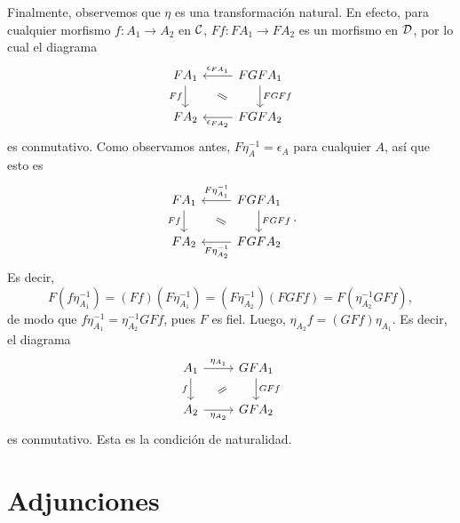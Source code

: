 \begin{sol}
    Finalmente, observemos que $\eta$ es una transformación natural.
    En efecto, para cualquier morfismo $f:A_1\to A_2$ en $\cal C$,
    $Ff:FA_1\to FA_2$ es un morfismo en $\cal D$, por lo cual el diagrama
    \[
        \begin{tikzcd}
            FA_1 \ar[d,"Ff"']
            & FGFA_1 \ar[l,"\epsilon_{FA_1}"'] \ar[d,"FGFf"] \\
            FA_2 & FGFA_2 \ar[l,"\epsilon_{FA_2}"]
            \com{1-1}{2-2}
        \end{tikzcd}
    \]
    es conmutativo.
    Como observamos antes, $F\eta_A^{-1}=\epsilon_A$ para cualquier $A$, así
    que esto es
    \[
        \begin{tikzcd}
            FA_1 \ar[d,"Ff"']
            & FGFA_1 \ar[l,"F\eta_{A_1}^{-1}"'] \ar[d,"FGFf"] \\
            FA_2 & FGFA_2 \ar[l,"F\eta_{A_2}^{-1}"]
            \com{1-1}{2-2}
        \end{tikzcd}
    .\]
    Es decir,
    \[
        F(f\eta_{A_1}^{-1})
        =(Ff)(F\eta_{A_1}^{-1})
        =(F\eta_{A_2}^{-1})(FGFf)
        =F(\eta_{A_2}^{-1}GFf)
    ,\]
    de modo que $f\eta_{A_1}^{-1}=\eta_{A_2}^{-1}GFf$, pues $F$ es fiel.
    Luego, $\eta_{A_2}f=(GFf)\eta_{A_1}$.
    Es decir, el diagrama
    \[
        \begin{tikzcd}
            A_1 \ar[d,"f"'] \ar[r,"\eta_{A_1}"]
            & GFA_1 \ar[d,"GFf"] \\
            A_2 \ar[r,"\eta_{A_2}"'] & GFA_2
            \com{1-2}{2-1}
        \end{tikzcd}
    \]
    es conmutativo.
    Esta es la condición de naturalidad.
\end{sol}

\section{Adjunciones}
\label{ss:adjunciones}

